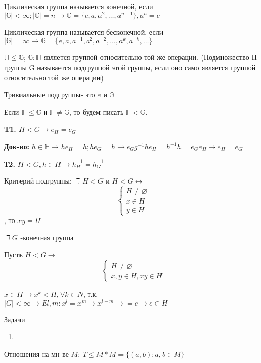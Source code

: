 \documentclass[12pt]{article}
\begin{document}
Циклическая группа называется конечной, если $|\mathds{G}|<\infty; |\mathds{G}|=n \rightarrow \mathds{G}=\{e,a,a^2, \dots , a^{n-1} \}, a^n=e$

Циклическая группа называется бесконечной, если $|\mathds{G}|= \infty \rightarrow \mathds{G}=\{ e,a,a^{-1},a^2,a^{-2}, \dots, a^k, a^{-k}, \dots \}$

$\mathds{H} \le \mathds{G}$;
$\mathds{G}:\mathds{H}$ является группой относительно той же операции. (Подмножество H группы G называется подгруппой этой группы, если оно само является группой относительно той же операции)

Тривиальные подгруппы- это $e$ и $\mathds{G}$

Если $\mathds{H}\le \mathds{G}$ и $\mathds{H} \not= \mathds{G}$, то будем писать $\mathds{H}<\mathds{G}$.

\textbf{T1.} $H<G \rightarrow e_H=e_G$

\textbf{Док-во:} $h \in \mathds{H} \rightarrow he_H=h ; he_G=h \rightarrow  e_Gg^{-1}he_H=h^{-1}h=e_Ge_H \rightarrow e_H=e_G $

\textbf{Т2.} $H<G, h \in H \rightarrow h_H^{-1}=h_G^{-1}$

Критерий подгруппы: $ \daleth  H<G$ и $H<G \leftrightarrow $ 
\begin{equation*}
 \begin{cases}
   H \not= \varnothing 
   \\
   x \in H
   \\
   y \in H
 \end{cases}
\end{equation*} , то $xy=H$ 

$\daleth G$ -конечная группа 

Пусть $H<G  \rightarrow$ 
\begin{equation*}
 \begin{cases}
   H \not= \varnothing  
   \\
   x,y \in H, xy \in H
 \end{cases}
\end{equation*}

$x\in H \rightarrow x^k <H, \forall k \in N$, т.к. $|G|<\infty\rightarrow E l,m : x^l=x^m\rightarrow x^{l-m}\rightarrow =e \rightarrow e \in H$

Задачи
\begin{enumerate}
\item 
\end{enumerate}

Отношения на мн-ве $M$:
$T \le M*M=\{(a,b):a,b\in M\}$
\end{document}
